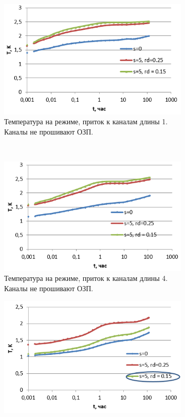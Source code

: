 \begin{figure}[H]
	\begin{subfigure}[b]{0.5\textwidth}
	\centering
	\includegraphics[width=1\textwidth]{pic/tunnels1.png}
	\caption{Температура на режиме, приток к каналам длины 1. Каналы не прошивают ОЗП.}
	\label{pic:tunnels1}
	\end{subfigure}
~
	\begin{subfigure}[b]{0.5\textwidth}
		\centering
		\includegraphics[width=1\textwidth]{pic/tunnels4.png}
		\caption{Температура на режиме, приток к каналам длины 4. Каналы не прошивают ОЗП.}
		\label{pic:tunnels4}
	\end{subfigure}
	\begin{subfigure}[b]{0.5\textwidth}
	\centering
	\includegraphics[width=1\textwidth]{pic/tunnels7.png}

\end{subfigure}
\end{figure}
